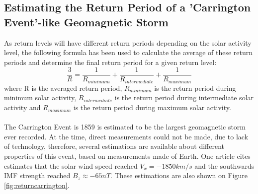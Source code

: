 \documentclass[12pt]{article}
\begin{document}
    \subsection{Estimating the Return Period of a 'Carrington Event'-like Geomagnetic Storm}\label{sec:carrington}
        As return levels will have different return periods depending on the solar activity level, the following formula has been used to calculate the average of these return periods and determine the final return period for a given return level:
        \begin{equation}
            \frac{3}{R}=\frac{1}{R_{minimum}}+\frac{1}{R_{intermediate}}+\frac{1}{R_{maximum}}
        \end{equation}
        where R is the averaged return period, $R_{minimum}$ is the return period during minimum solar activity, $R_{intermediate}$ is the return period during intermediate solar activity and $R_{maximum}$ is the return period during maximum solar activity.\\ \\
        The Carrington Event is 1859 is estimated to be the largest geomagnetic storm ever recorded. At the time, direct measurements could not be made, due to lack of technology, therefore, several estimations are available about different properties of this event, based on measurements made of Earth. One article cites\cite{2013cliver} estimates that the solar wind speed reached $V_x=-1850 km/s$ and the southwards IMF strength reached $B_z\approx -65nT$. These estimations are also shown on Figure \ref{fig:returncarrington}.\\
\end{document}
